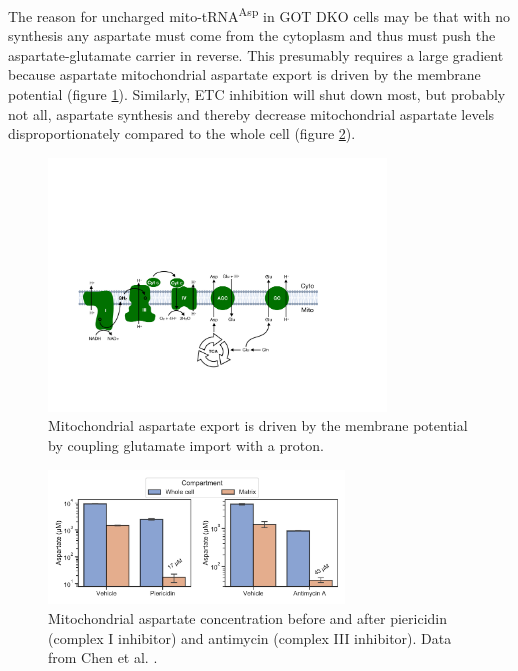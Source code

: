 \FloatBarrier
The reason for uncharged mito-tRNA\textsuperscript{Asp} in GOT DKO cells may be that with no synthesis any aspartate must come from the cytoplasm and thus must push the aspartate-glutamate carrier in reverse.
This presumably requires a large gradient because aspartate mitochondrial aspartate export is driven by the membrane potential (figure \ref{fig:sapp:tRNA:mito_asp_export}).
Similarly, ETC inhibition will shut down most, but probably not all, aspartate synthesis and thereby decrease mitochondrial aspartate levels disproportionately compared to the whole cell (figure \ref{fig:sapp:tRNA:mito_asp_levels}).

\begin{figure}[ht]
    \centering
    \includegraphics[width=0.8\textwidth]{figures/sapp/tRNA/mito_asp_export.pdf}
    \caption[Model of mitochondrial aspartate export.]{
    Mitochondrial aspartate export is driven by the membrane potential by coupling glutamate import with a proton.
    }
    \label{fig:sapp:tRNA:mito_asp_export}
\end{figure}

\begin{figure}[ht]
    \centering
    \includegraphics[width=0.70\textwidth]{figures/sapp/tRNA/mito_asp_levels.pdf}
    \caption[Mitochondrial aspartate levels upon ETC inhibition.]{
    Mitochondrial aspartate concentration before and after piericidin (complex I inhibitor) and antimycin (complex III inhibitor).
    Data from Chen et al. \cite{Chen2016-mf}.
    }
    \label{fig:sapp:tRNA:mito_asp_levels}
\end{figure}





